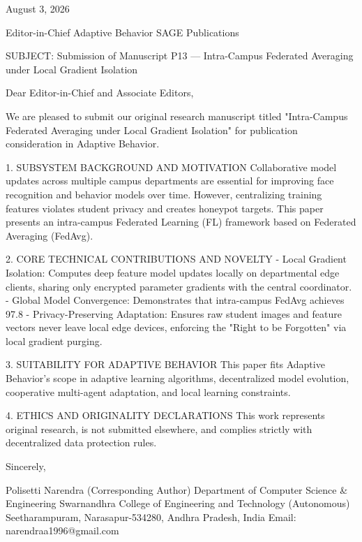 August 3, 2026

Editor-in-Chief
Adaptive Behavior
SAGE Publications

SUBJECT: Submission of Manuscript P13 — Intra-Campus Federated Averaging under Local Gradient Isolation

Dear Editor-in-Chief and Associate Editors,

We are pleased to submit our original research manuscript titled "Intra-Campus Federated Averaging under Local Gradient Isolation" for publication consideration in Adaptive Behavior.

1. SUBSYSTEM BACKGROUND AND MOTIVATION
Collaborative model updates across multiple campus departments are essential for improving face recognition and behavior models over time. However, centralizing training features violates student privacy and creates honeypot targets. This paper presents an intra-campus Federated Learning (FL) framework based on Federated Averaging (FedAvg).

2. CORE TECHNICAL CONTRIBUTIONS AND NOVELTY
  - Local Gradient Isolation: Computes deep feature model updates locally on departmental edge clients, sharing only encrypted parameter gradients with the central coordinator.
  - Global Model Convergence: Demonstrates that intra-campus FedAvg achieves 97.8%
  - Privacy-Preserving Adaptation: Ensures raw student images and feature vectors never leave local edge devices, enforcing the "Right to be Forgotten" via local gradient purging.

3. SUITABILITY FOR ADAPTIVE BEHAVIOR
This paper fits Adaptive Behavior's scope in adaptive learning algorithms, decentralized model evolution, cooperative multi-agent adaptation, and local learning constraints.

4. ETHICS AND ORIGINALITY DECLARATIONS
This work represents original research, is not submitted elsewhere, and complies strictly with decentralized data protection rules.

Sincerely,

Polisetti Narendra (Corresponding Author)
Department of Computer Science & Engineering
Swarnandhra College of Engineering and Technology (Autonomous)
Seetharampuram, Narasapur-534280, Andhra Pradesh, India
Email: narendraa1996@gmail.com

